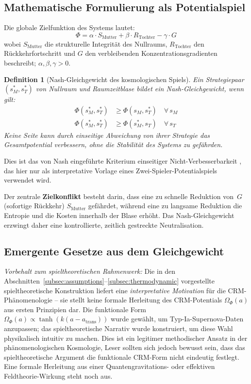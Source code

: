 \documentclass[aps,prd,twocolumn,superscriptaddress,nofootinbib]{revtex4-2}
\newtheorem{definition}{Definition}
\begin{document}
\subsection{Mathematische Formulierung als Potentialspiel}
\label{subsec:potentialgame}

Die globale Zielfunktion des Systems lautet:
\begin{equation}
\Phi = \alpha \cdot S_{\mathrm{Mutter}} + \beta \cdot R_{\mathrm{Tochter}} - \gamma \cdot G
\label{eq:potential}
\end{equation}
wobei $S_{\mathrm{Mutter}}$ die strukturelle Integrität des Nullraums, $R_{\mathrm{Tochter}}$ den Rückkehrfortschritt und $G$ den verbleibenden Konzentrationsgradienten beschreibt; $\alpha, \beta, \gamma > 0$.

\begin{definition}[Nash-Gleichgewicht des kosmologischen Spiels]
Ein Strategiepaar $(s_M^*, s_T^*)$ von Nullraum und Raumzeitblase bildet ein Nash-Gleichgewicht, wenn gilt:
\begin{align}
\Phi(s_M^*, s_T^*) &\geq \Phi(s_M, s_T^*) \quad \forall\, s_M \\
\Phi(s_M^*, s_T^*) &\geq \Phi(s_M^*, s_T) \quad \forall\, s_T
\end{align}
Keine Seite kann durch einseitige Abweichung von ihrer Strategie das Gesamtpotential verbessern, ohne die Stabilität des Systems zu gefährden.
\end{definition}

Dies ist das von Nash eingeführte Kriterium einseitiger Nicht-Verbesserbarkeit \cite{Nash1950}, das hier nur als interpretative Vorlage eines Zwei-Spieler-Potentialspiels verwendet wird.

Der zentrale \textbf{Zielkonflikt} besteht darin, dass eine zu schnelle Reduktion von~$G$ (sofortige Rückkehr) $S_{\mathrm{Mutter}}$ gefährdet, während eine zu langsame Reduktion die Entropie und die Kosten innerhalb der Blase erhöht. Das Nash-Gleichgewicht erzwingt daher eine kontrollierte, zeitlich gestreckte Neutralisation.

\subsection{Emergente Gesetze aus dem Gleichgewicht}
\label{subsec:emergentlaws}

\textit{Vorbehalt zum spieltheoretischen Rahmenwerk:} Die in den Abschnitten~\ref{subsec:assumptions}--\ref{subsec:thermodynamic} vorgestellte spieltheoretische Konstruktion liefert eine \emph{interpretative Motivation} für die CRM-Phänomenologie -- sie stellt keine formale Herleitung des CRM-Potentials $\Omega_\Phi(a)$ aus ersten Prinzipien dar. Die funktionale Form $\Omega_\Phi(a) \propto \tanh(k(a - a_\mathrm{trans}))$ wurde gewählt, um Typ-Ia-Supernova-Daten anzupassen; das spieltheoretische Narrativ wurde konstruiert, um diese Wahl physikalisch intuitiv zu machen. Dies ist ein legitimer methodischer Ansatz in der phänomenologischen Kosmologie, Leser sollten sich jedoch bewusst sein, dass das spieltheoretische Argument die funktionale CRM-Form nicht eindeutig festlegt. Eine formale Herleitung aus einer Quantengravitations- oder effektiven Feldtheorie-Wirkung steht noch aus.
\end{document}
